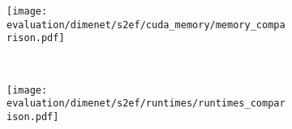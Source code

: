 \begin{figure}[H]
    \centering

    \begin{subfigure}[t]{0.48\textwidth}
        \centering
        \texttt{[image: evaluation/dimenet/s2ef/cuda\_memory/memory\_comparison.pdf]}
        \label{fig:dimenet-s2ef-memory-results}
    \end{subfigure}%
    ~
    \begin{subfigure}[t]{0.48\textwidth}
        \centering
        \texttt{[image: evaluation/dimenet/s2ef/runtimes/runtimes\_comparison.pdf]}
        \label{dimenet-s2ef-runtimes-results}
    \end{subfigure}

    \vspace*{-1em}


\end{figure}
